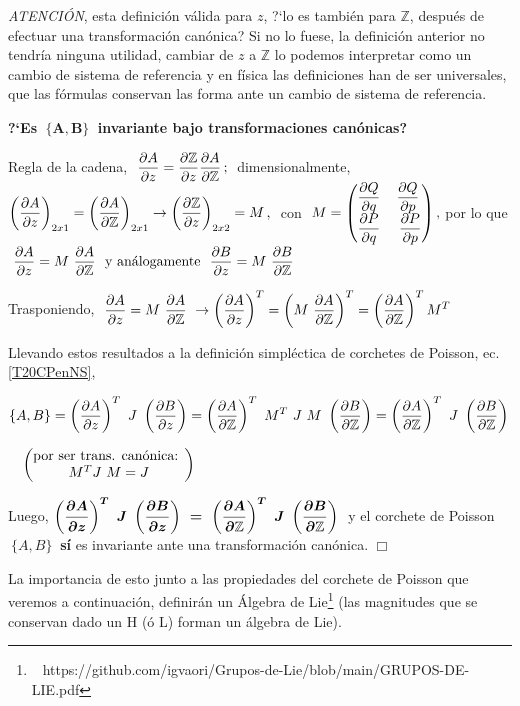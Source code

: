 \vspace{5mm}
\emph{ATENCIÓN}, esta definición válida para $z$, ?`lo es también para $\mathbb Z$, después de efectuar una transformación canónica? Si no lo fuese, la definición anterior no tendría ninguna utilidad, cambiar de $z$ a $\mathbb Z$ lo podemos interpretar como un cambio de sistema de referencia y en física las definiciones han de ser universales, que las fórmulas conservan las forma ante un cambio de sistema de referencia.

\textbf{?`Es $\boldsymbol{ \ \{A,B\} \ }$ invariante bajo transformaciones canónicas?}

Regla de la cadena, $\ \displaystyle \pdv{A}{z}=\pdv{\mathbb Z}{z} \pdv{A}{\mathbb Z}\, ; \ $ dimensionalmente, $\displaystyle \left(\pdv{A}{z}\right)_{2x1}= \left(\pdv{A}{\mathbb Z}\right)_{2x1}  \to \left(\pdv{\mathbb Z}{z}\right)_{2x2}= M\, , \ $ con $\ M=\mqty( \displaystyle \pdv{Q}{q} & \displaystyle \pdv{Q}{p} \\ \displaystyle \pdv{P}{q} & \ \displaystyle \pdv{P}{p})\, , $ por lo que $\ \displaystyle \pdv{A}{z} = M \ \pdv{A}{\mathbb Z} \ \text{ y análogamente } \ \pdv{B}{z} = M \ \pdv{B}{\mathbb Z}$

Trasponiendo, $\ \displaystyle \pdv{A}{z} = M \ \pdv{A}{\mathbb Z} \ \to \left(\pdv{A}{z}\right)^T = \left( M \ \pdv{A}{\mathbb Z} \right)^T = \left( \pdv{A}{\mathbb Z} \right)^T M^T$

Llevando estos resultados a la definición simpléctica de corchetes de Poisson, ec. \ref{T20CPenNS},

$\{A,B\} = \displaystyle \left( \pdv{A}{z} \right)^T \ J \ \left(\pdv{B}{z}\right) = \left( \pdv{A}{\mathbb Z} \right)^T \ M^T\ J \ M\ \left(\pdv{B}{\mathbb Z}\right) = \left( \pdv{A}{\mathbb Z} \right)^T \ J \ \left(\pdv{B}{ \mathbb Z}\right)$
\begin{tiny}\textcolor{gris}{$\quad \mqty(\text{por ser trans. canónica: } \\ M^TJ\ M = J)$}\end{tiny}


Luego, $\displaystyle \boldsymbol{ \left( \pdv{A}{z} \right)^T \ J \ \left(\pdv{B}{z}\right) \ = \ \left( \pdv{A}{\mathbb Z} \right)^T \ J \ \left(\pdv{B}{ \mathbb Z}\right) } \ $ y el corchete de Poisson $\ \{A,B\} \ $ \textbf{sí} es invariante ante una transformación canónica. \hspace{9.5cm} $\Box$


\textcolor{gris}{La importancia de esto junto a las propiedades del corchete de Poisson que veremos a continuación, definirán un Álgebra de Lie\footnote{$\ \ $ https://github.com/igvaori/Grupos-de-Lie/blob/main/GRUPOS-DE-LIE.pdf} (las magnitudes que se conservan dado un H (ó L) forman un álgebra de Lie).}

